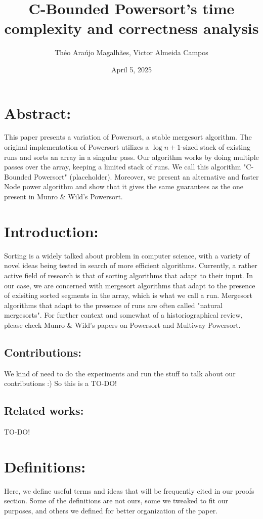 \documentclass{article}
\title{\textbf{C-Bounded Powersort's time complexity and correctness analysis}}
\author{Théo Araújo Magalhães, Victor Almeida Campos} %
\date{April 5, 2025}
\begin{document}
\maketitle

\section*{Abstract:}
This paper presents a variation of Powersort, a stable mergesort algorithm. 
The original implementation of Powersort utilizes a $\log n + 1$-sized stack of existing runs and 
sorts an array in a singular pass\cite{https://doi.org/10.4230/lipics.esa.2018.63}.
Our algorithm works by doing multiple passes over the array, keeping a limited stack of runs. 
We call this algorithm "C-Bounded Powersort" (placeholder). Moreover,
we present an alternative and faster Node power algorithm and
show that it gives the same guarantees as the one present in Munro $\&{}$ Wild's Powersort.
\section{Introduction:} Sorting is a widely talked about problem in computer science, with a 
variety of novel ideas being tested in search of more efficient algorithms. Currently,
a rather active field of research is that of sorting algorithms that adapt to their input. In our case,
we are concerned with mergesort algorithms that adapt to the presence of exisiting sorted segments in the
array, which is what we call a run. Mergesort algorithms that adapt to the
presence of runs are often called "natural mergesorts"\cite{https://doi.org/10.4230/lipics.esa.2018.63}.
For further context and somewhat of a historiographical review, please check Munro $\&{}$ Wild's papers
on Powersort and Multiway Powersort.\cite{Gelling_2023}\cite{https://doi.org/10.4230/lipics.esa.2018.63}
\subsection{Contributions:} 
We kind of need to do the experiments and run the stuff to talk about our contributions :)
So this is a TO-DO!
\subsection{Related works:}
TO-DO!
\section{Definitions:}
Here, we define useful terms and ideas that will be frequently
cited in our proofs section. Some of the definitions 
are not ours, some we tweaked to fit our purposes, and others 
we defined for better organization of the paper. 
\end{document}
